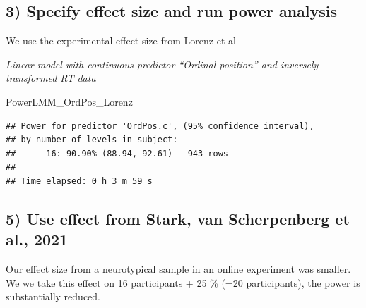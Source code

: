 \documentclass[
]{article}
\newenvironment{Shaded}{\begin{snugshade}}{\end{snugshade}}
\newcommand{\AttributeTok}[1]{\textcolor[rgb]{0.77,0.63,0.00}{#1}}
\newcommand{\CommentTok}[1]{\textcolor[rgb]{0.56,0.35,0.01}{\textit{#1}}}
\newcommand{\DecValTok}[1]{\textcolor[rgb]{0.00,0.00,0.81}{#1}}
\newcommand{\FunctionTok}[1]{\textcolor[rgb]{0.00,0.00,0.00}{#1}}
\newcommand{\NormalTok}[1]{#1}
\newcommand{\OtherTok}[1]{\textcolor[rgb]{0.56,0.35,0.01}{#1}}
\newcommand{\SpecialCharTok}[1]{\textcolor[rgb]{0.00,0.00,0.00}{#1}}
\newcommand{\StringTok}[1]{\textcolor[rgb]{0.31,0.60,0.02}{#1}}
\begin{document}
\hypertarget{specify-effect-size-and-run-power-analysis}{%
\subsection{3) Specify effect size and run power
analysis}\label{specify-effect-size-and-run-power-analysis}}

We use the experimental effect size from Lorenz et al

\emph{Linear model with continuous predictor ``Ordinal position'' and
inversely transformed RT data}

\begin{Shaded}
\end{Shaded}

\begin{Shaded}
\begin{Highlighting}[]
\NormalTok{PowerLMM\_OrdPos\_Lorenz}
\end{Highlighting}
\end{Shaded}

\begin{verbatim}
## Power for predictor 'OrdPos.c', (95% confidence interval),
## by number of levels in subject:
##      16: 90.90% (88.94, 92.61) - 943 rows
## 
## Time elapsed: 0 h 3 m 59 s
\end{verbatim}

\hypertarget{use-effect-from-stark-van-scherpenberg-et-al.-2021}{%
\subsection{5) Use effect from Stark, van Scherpenberg et al.,
2021}\label{use-effect-from-stark-van-scherpenberg-et-al.-2021}}

Our effect size from a neurotypical sample in an online experiment was
smaller. We we take this effect on 16 participants + 25 \% (=20
participants), the power is substantially reduced.
\end{document}
